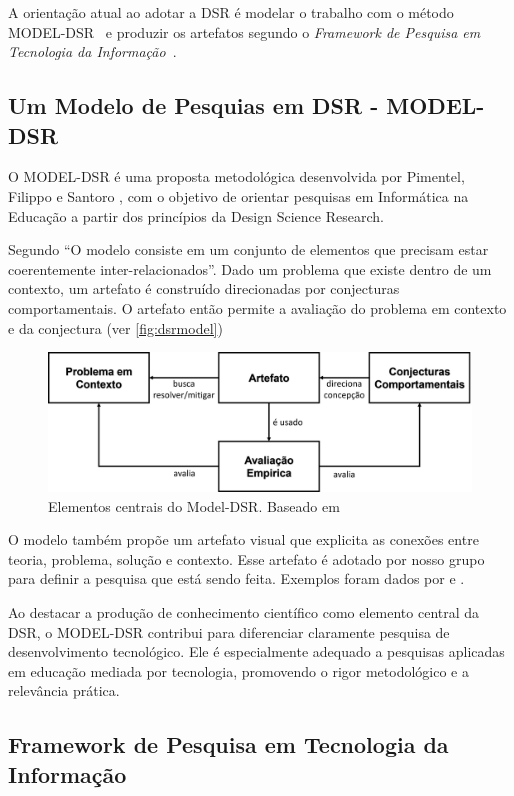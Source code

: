 A orientação atual ao adotar a DSR é modelar o trabalho com o método MODEL-DSR~\citep{pimentel2019dsr,pimentel2023} e produzir os artefatos segundo o \textit{Framework de Pesquisa em Tecnologia da Informação}~\citep{march1995design}.


\subsection{Um Modelo de Pesquias em DSR - MODEL-DSR}

O MODEL-DSR é uma proposta metodológica desenvolvida por Pimentel, Filippo e Santoro \cite{pimentel2019dsr,pimentel2023}, com o objetivo de orientar pesquisas em Informática na Educação a partir dos princípios da Design Science Research. 

Segundo \citet{pimentel2023} ``O modelo consiste em um conjunto de elementos que precisam estar coerentemente inter-relacionados''. Dado um problema que existe dentro de um contexto, um artefato é construído direcionadas por conjecturas comportamentais. O artefato então permite a avaliação do problema em contexto e da conjectura (ver \autoref{fig:dsrmodel})

\begin{figure}
    \centering
    \includegraphics[width=0.5\linewidth]{Images/dsr pimental.png}
    \caption{Elementos centrais do Model-DSR. Baseado em \citep{pimentel2023}}
    \label{fig:dsrmodel}
\end{figure}

O modelo também propõe um artefato visual que explicita as conexões entre teoria, problema, solução e contexto. Esse artefato é adotado por nosso grupo para definir a pesquisa que está sendo feita. Exemplos foram dados por \citet{pimentel2019dsr} e \citet{pimentel2023}.

Ao destacar a produção de conhecimento científico como elemento central da DSR, o MODEL-DSR contribui para diferenciar claramente pesquisa de desenvolvimento tecnológico. Ele é especialmente adequado a pesquisas aplicadas em educação mediada por tecnologia, promovendo o rigor metodológico e a relevância prática.

\subsection{Framework de Pesquisa em Tecnologia da Informação}

